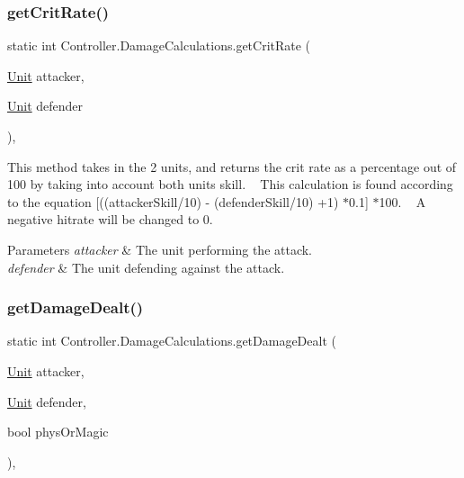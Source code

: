 \subsubsection{\texorpdfstring{get\+Crit\+Rate()}{getCritRate()}}
{\footnotesize\ttfamily static int Controller.\+Damage\+Calculations.\+get\+Crit\+Rate (\begin{DoxyParamCaption}\item[{\hyperlink{interface_model_1_1_unit_module_1_1_unit}{Unit}}]{attacker,  }\item[{\hyperlink{interface_model_1_1_unit_module_1_1_unit}{Unit}}]{defender }\end{DoxyParamCaption})\hspace{0.3cm}{\ttfamily [inline]}, {\ttfamily [static]}}

This method takes in the 2 units, and returns the crit rate as a percentage out of 100 by taking into account both unit\textquotesingle{}s skill. ~\newline
This calculation is found according to the equation \mbox{[}((attacker\+Skill/10) -\/ (defender\+Skill/10) +1) $\ast$0.1\mbox{]} $\ast$100. ~\newline
A negative hitrate will be changed to 0. 
\begin{DoxyParams}{Parameters}
{\em attacker} & The unit performing the attack. \\
\hline
{\em defender} & The unit defending against the attack. \\
\hline
\end{DoxyParams}
\hypertarget{class_controller_1_1_damage_calculations_acdba16963fcb012c9ca44635e98b2e08}{}\label{class_controller_1_1_damage_calculations_acdba16963fcb012c9ca44635e98b2e08} 
\subsubsection{\texorpdfstring{get\+Damage\+Dealt()}{getDamageDealt()}}
{\footnotesize\ttfamily static int Controller.\+Damage\+Calculations.\+get\+Damage\+Dealt (\begin{DoxyParamCaption}\item[{\hyperlink{interface_model_1_1_unit_module_1_1_unit}{Unit}}]{attacker,  }\item[{\hyperlink{interface_model_1_1_unit_module_1_1_unit}{Unit}}]{defender,  }\item[{bool}]{phys\+Or\+Magic }\end{DoxyParamCaption})\hspace{0.3cm}{\ttfamily [inline]}, {\ttfamily [static]}}

